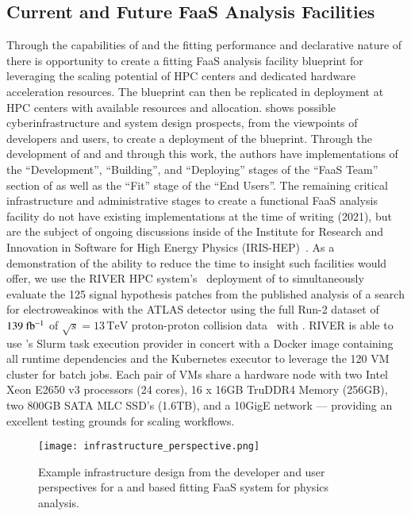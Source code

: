 \subsection{Current and Future FaaS Analysis Facilities}\label{subsec:FaaS_analysis_facilities}

Through the capabilities of \funcX{} and the fitting performance and declarative nature of \pyhf{} there is opportunity to create a fitting FaaS analysis facility blueprint for leveraging the scaling potential of HPC centers and dedicated hardware acceleration resources.
The blueprint can then be replicated in deployment at HPC centers with available resources and allocation.
 shows possible cyberinfrastructure and system design prospects, from the viewpoints of developers and users, to create a deployment of the blueprint.
Through the development of \pyhf{} and \funcX{} and through this work, the authors have implementations of the ``Development'', ``Building'', and ``Deploying'' stages of the ``FaaS Team'' section of  as well as the ``Fit'' stage of the ``End Users''.
The remaining critical infrastructure and administrative stages to create a functional FaaS analysis facility do not have existing implementations at the time of writing (2021), but are the subject of ongoing discussions inside of the Institute for Research and Innovation in Software for High Energy Physics (IRIS-HEP)~\cite{IRIS-HEP:strategic-plan}.
As a demonstration of the ability to reduce the time to insight such facilities would offer, we use the RIVER HPC system's~\cite{RIVER_HPC} deployment of \funcX{} to simultaneously evaluate the 125 signal hypothesis patches from the published analysis of a search for electroweakinos with the ATLAS detector using the full Run-2 dataset of \(139~\ifb\) of \(\sqrt{s} = 13\,\text{TeV}\) proton-proton collision data~\cite{SUSY-2019-08} with \pyhf{}.
RIVER is able to use \funcX{}'s Slurm task execution provider in concert with a Docker image containing all runtime dependencies and the Kubernetes \funcX{} executor to leverage the 120 VM cluster for batch jobs.
Each pair of VMs share a hardware node with two Intel Xeon E2650 v3 processors (24 cores), 16 x 16GB TruDDR4 Memory (256GB), two 800GB SATA MLC SSD's (1.6TB), and a 10GigE network --- providing an excellent testing grounds for scaling workflows.

\begin{figure}[!htpb]
    \centering
    \texttt{[image: infrastructure\_perspective.png]}
    \caption{Example infrastructure design from the developer and user perspectives for a \pyhf{} and \funcX{} based fitting FaaS system for physics analysis.~\cite{portable_inference_workshop}}
    \label{fig:infrastructure_perspective}
\end{figure}
